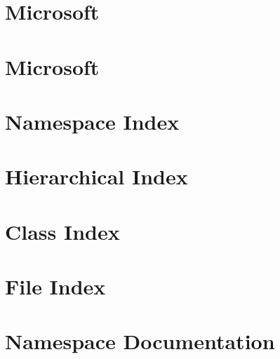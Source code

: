 \documentclass[twoside]{book}
\begin{document}
\chapter{Microsoft}
\label{a00036}
\hypertarget{a00036}{}

\chapter{Microsoft}
\label{a00038}
\hypertarget{a00038}{}

\chapter{Namespace Index}

\chapter{Hierarchical Index}

\chapter{Class Index}

\chapter{File Index}

\chapter{Namespace Documentation}












\end{document}
